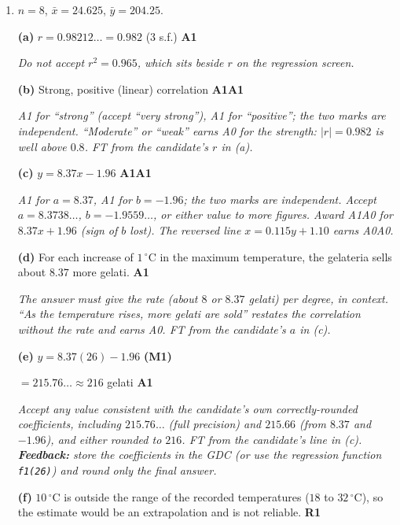 \documentclass[12pt, twoside]{article}
\begin{document}
\begin{enumerate}[itemsep=0.3cm]

\item[1.] [Maximum mark: 9]

$n = 8$, \quad $\bar{x} = 24.625$, \quad $\bar{y} = 204.25$.

\textbf{(a)} $r = 0.98212\ldots = 0.982$ (3 s.f.) \hfill \textbf{A1}

\emph{Do not accept $r^{2} = 0.965$, which sits beside $r$ on the
regression screen.}

\textbf{(b)} Strong, positive (linear) correlation \hfill \textbf{A1A1}

\emph{A1 for ``strong'' (accept ``very strong''), A1 for ``positive''; the two
marks are independent. ``Moderate'' or ``weak'' earns A0 for the strength:
$|r| = 0.982$ is well above $0.8$. FT from the candidate's $r$ in (a).}

\textbf{(c)} $y = 8.37x - 1.96$ \hfill \textbf{A1A1}

\emph{A1 for $a = 8.37$, A1 for $b = -1.96$; the two marks are independent.
Accept $a = 8.3738\ldots$, $b = -1.9559\ldots$, or either value to more
figures. Award A1A0 for $8.37x + 1.96$ (sign of $b$ lost). The reversed line
$x = 0.115y + 1.10$ earns A0A0.}

\textbf{(d)} For each increase of $1\,^{\circ}$C in the maximum temperature,
the gelateria sells about $8.37$ more gelati. \hfill \textbf{A1}

\emph{The answer must give the rate (about $8$ or $8.37$ gelati) per degree,
in context. ``As the temperature rises, more gelati are sold'' restates the
correlation without the rate and earns A0. FT from the candidate's $a$ in
(c).}

\textbf{(e)} $y = 8.37(26) - 1.96$ \hfill \textbf{(M1)}

$= 215.76\ldots \approx 216$ gelati \hfill \textbf{A1}

\emph{Accept any value consistent with the candidate's own correctly-rounded
coefficients, including $215.76\ldots$ (full precision) and $215.66$ (from
$8.37$ and $-1.96$), and either rounded to $216$. FT from the candidate's
line in (c). \textbf{Feedback:} store the coefficients in the GDC (or use the
regression function \texttt{f1(26)}) and round only the final answer.}

\textbf{(f)} $10\,^{\circ}$C is outside the range of the recorded
temperatures ($18$ to $32\,^{\circ}$C), so the estimate would be an
extrapolation and is not reliable. \hfill \textbf{R1}


\end{enumerate}
\end{document}
